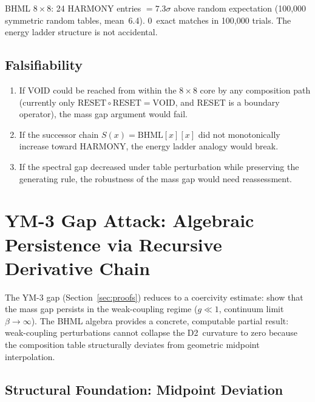 \documentclass[11pt]{article}
\begin{document}
BHML $8\times 8$: 24 HARMONY entries $= 7.3\sigma$ above random
expectation (100{,}000 symmetric random tables, mean~6.4). 0~exact
matches in 100{,}000 trials. The energy ladder structure is not
accidental.

\subsection{Falsifiability}
\label{ssec:bhml-falsifiability}

\begin{enumerate}
  \item If VOID could be reached from within the $8\times 8$ core by
    any composition path (currently only
    $\text{RESET} \circ \text{RESET} = \text{VOID}$, and RESET is a
    boundary operator), the mass gap argument would fail.
  \item If the successor chain $S(x) = \mathrm{BHML}[x][x]$ did not
    monotonically increase toward HARMONY, the energy ladder analogy
    would break.
  \item If the spectral gap decreased under table perturbation while
    preserving the generating rule, the robustness of the mass gap
    would need reassessment.
\end{enumerate}

\section{YM-3 Gap Attack: Algebraic Persistence via Recursive Derivative Chain}
\label{sec:ym3-attack}

The YM-3 gap (Section~\ref{sec:proofs}) reduces to a coercivity estimate:
show that the mass gap persists in the weak-coupling regime
($g \ll 1$, continuum limit $\beta \to \infty$).  The BHML algebra
provides a concrete, computable partial result: weak-coupling
perturbations cannot collapse the D2~curvature to zero because the
composition table structurally deviates from geometric midpoint
interpolation.

\subsection{Structural Foundation: Midpoint Deviation}
\label{ssec:ym3-midpoint}
\end{document}
